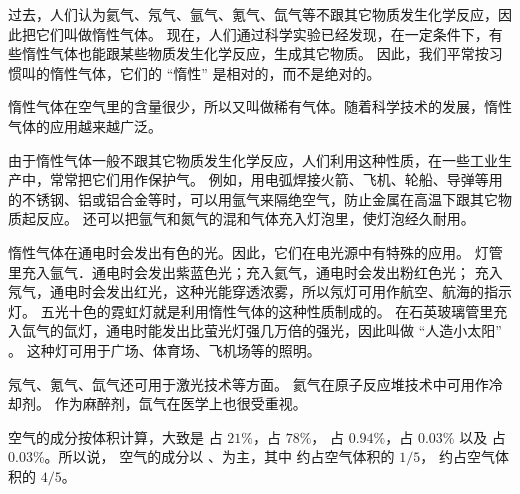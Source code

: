 过去，人们认为氦气、氖气、氩气、氪气、氙气等不跟其它物质发生化学反应，因此把它们叫做惰性气体。
现在，人们通过科学实验已经发现，在一定条件下，有些惰性气体也能跟某些物质发生化学反应，生成其它物质。
因此，我们平常按习惯叫的惰性气体，它们的 “惰性” 是相对的，而不是绝对的。

惰性气体在空气里的含量很少，所以又叫做稀有气体。随着科学技术的发展，惰性气体的应用越来越广泛。

由于惰性气体一般不跟其它物质发生化学反应，人们利用这种性质，在一些工业生产中，常常把它们用作保护气。
例如，用电弧焊接火箭、飞机、轮船、导弹等用的不锈钢、铝或铝合金等时，可以用氩气来隔绝空气，防止金属在高温下跟其它物质起反应。
还可以把氩气和氮气的混和气体充入灯泡里，使灯泡经久耐用。

惰性气体在通电时会发出有色的光。因此，它们在电光源中有特殊的应用。
灯管里充入氩气．通电时会发出紫蓝色光；充入氦气，通电时会发出粉红色光；
充入氖气，通电时会发出红光，这种光能穿透浓雾，所以氖灯可用作航空、航海的指示灯。
五光十色的霓虹灯就是利用惰性气体的这种性质制成的。
在石英玻璃管里充入氙气的氙灯，通电时能发出比萤光灯强几万倍的强光，因此叫做 “人造小太阳” 。
这种灯可用于广场、体育场、飞机场等的照明。

氖气、氪气、氙气还可用于激光技术等方面。
氦气在原子反应堆技术中可用作冷却剂。
作为麻醉剂，氙气在医学上也很受重视。


\begin{xiti}


空气的成分按体积计算，大致是 \xhx 占 $21\%$，\xhx 占 $78\%$，
\xhx 占 $0.94\%$，\xhx 占 $0.03\%$ 以及 \xhx 占 $0.03\%$。所以说，
空气的成分以 \xhx 、\xhx 为主，其中 \xhx 约占空气体积的 $1/5$，
\xhx 约占空气体积的 $4/5$。


\begin{xiaoxiaotis}




\end{xiaoxiaotis}

\end{xiti}


